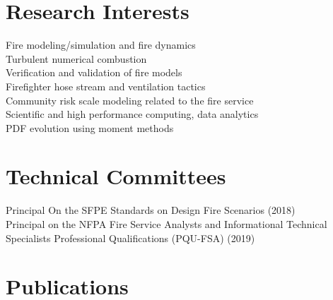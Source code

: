 \documentclass[10pt,letterpaper]{article}
\begin{document}
\section*{Research Interests}
Fire modeling/simulation and fire dynamics \\
Turbulent numerical combustion \\
Verification and validation of fire models \\
Firefighter hose stream and ventilation tactics \\
Community risk scale modeling related to the fire service \\
Scientific and high performance computing, data analytics \\
PDF evolution using moment methods \\

\section*{Technical Committees}

Principal On the SFPE Standards on Design Fire Scenarios (2018) \\
Principal on the NFPA Fire Service Analysts and Informational Technical Specialists Professional Qualifications (PQU-FSA) (2019) \\

\clearpage

\section*{Publications}

\nocite{*}
\printbibliography[title=Journal Articles, type=article]
\printbibliography[title=Peer Reviewed Technical Reports, type=report]
\printbibliography[title=In Proceedings, type=inproceedings]

\clearpage
\end{document}
